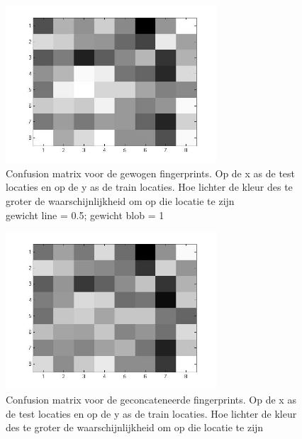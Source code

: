 \documentclass[a4paper]{article}
\begin{document}
\begin{figure}[h]
	\centering
	\includegraphics[width=0.7\textwidth]{combinedconfusion.jpg}
	\caption{Confusion matrix voor de gewogen fingerprints. Op de x as de test locaties en op de y as de train locaties. Hoe lichter de kleur des te groter de waarschijnlijkheid om op die locatie te zijn\\gewicht line = 0.5; gewicht blob = 1}
	\label{fig:combinedconfusion}
\end{figure}
\begin{figure}[h]
	\centering
	\includegraphics[width=0.7\textwidth]{combinedconfusion_concat.jpg}
	\caption{Confusion matrix voor de geconcateneerde fingerprints.  Op de x as de test locaties en op de y as de train locaties. Hoe lichter de kleur des te groter de waarschijnlijkheid om op die locatie te zijn}
	\label{fig:combinedconfusion_concat}
\end{figure}
\end{document}
